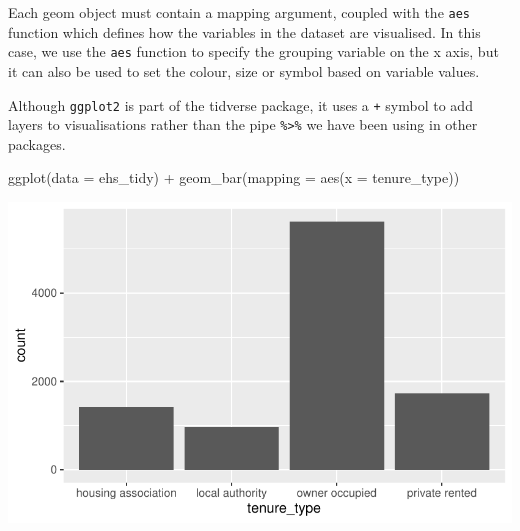 \documentclass[
  letterpaper,
  DIV=11,
  numbers=noendperiod]{scrreprt}
\newenvironment{Shaded}{\begin{snugshade}}{\end{snugshade}}
\newcommand{\AttributeTok}[1]{\textcolor[rgb]{0.40,0.45,0.13}{#1}}
\newcommand{\FunctionTok}[1]{\textcolor[rgb]{0.28,0.35,0.67}{#1}}
\newcommand{\NormalTok}[1]{\textcolor[rgb]{0.00,0.23,0.31}{#1}}
\newcommand{\SpecialCharTok}[1]{\textcolor[rgb]{0.37,0.37,0.37}{#1}}
\begin{document}
Each geom object must contain a mapping argument, coupled with the
\texttt{aes} function which defines how the variables in the dataset are
visualised. In this case, we use the \texttt{aes} function to specify
the grouping variable on the x axis, but it can also be used to set the
colour, size or symbol based on variable values.

\begin{tcolorbox}[enhanced jigsaw, bottomrule=.15mm, left=2mm, leftrule=.75mm, bottomtitle=1mm, coltitle=black, colbacktitle=quarto-callout-warning-color!10!white, toptitle=1mm, arc=.35mm, breakable, title=\textcolor{quarto-callout-warning-color}{\faExclamationTriangle}\hspace{0.5em}{Warning}, rightrule=.15mm, toprule=.15mm, opacityback=0, opacitybacktitle=0.6, titlerule=0mm, colback=white, colframe=quarto-callout-warning-color-frame]

Although \texttt{ggplot2} is part of the tidverse package, it uses a
\texttt{+} symbol to add layers to visualisations rather than the pipe
\texttt{\%\textgreater{}\%} we have been using in other packages.

\end{tcolorbox}

\begin{Shaded}
\begin{Highlighting}[]
\FunctionTok{ggplot}\NormalTok{(}\AttributeTok{data =}\NormalTok{ ehs\_tidy) }\SpecialCharTok{+}
  \FunctionTok{geom\_bar}\NormalTok{(}\AttributeTok{mapping =} \FunctionTok{aes}\NormalTok{(}\AttributeTok{x =}\NormalTok{ tenure\_type))}
\end{Highlighting}
\end{Shaded}

\includegraphics{visualisation_files/figure-pdf/bar chart tenure_type-1.pdf}
\end{document}
